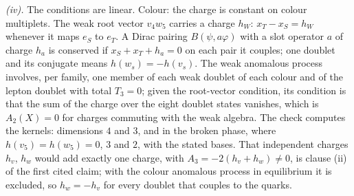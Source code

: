 \emph{(iv).} The conditions are linear. Colour: the charge is constant on colour multiplets. The weak root vector $v_{4}w_{5}$ carries a charge $h_{W}$: $x_{T} - x_{S} = h_{W}$ whenever it maps $e_{S}$ to $e_{T}$. A Dirac pairing $B(\psi, a\varphi)$ with a slot operator $a$ of charge $h_{a}$ is conserved if $x_{S} + x_{T} + h_{a} = 0$ on each pair it couples; one doublet and its conjugate means $h(w_{s}) = -h(v_{s})$. The weak anomalous process involves, per family, one member of each weak doublet of each colour and of the lepton doublet with total $T_{3} = 0$; given the root-vector condition, its condition is that the sum of the charge over the eight doublet states vanishes, which is $A_{2}(X) = 0$ for charges commuting with the weak algebra. The check computes the kernels: dimensions $4$ and $3$, and in the broken phase, where $h(v_{5}) = h(w_{5}) = 0$, $3$ and $2$, with the stated bases. That independent charges $h_{v}$, $h_{w}$ would add exactly one charge, with $A_{3} = -2(h_{v} + h_{w}) \neq 0$, is clause (ii) of the first cited claim; with the colour anomalous process in equilibrium it is excluded, so $h_{w} = -h_{v}$ for every doublet that couples to the quarks.

